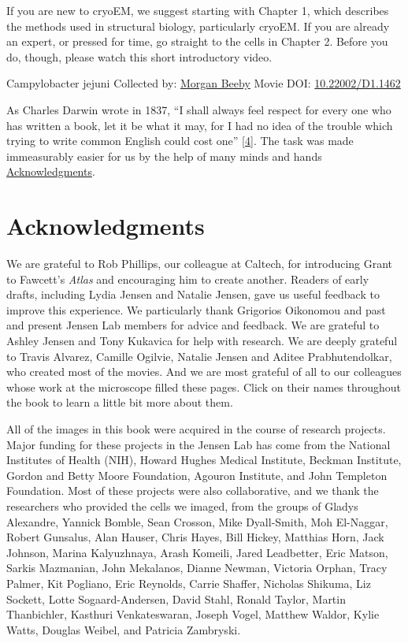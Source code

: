 \documentclass[]{tufte-book}
\begin{document}
If you are new to cryoEM, we suggest starting with Chapter 1, which describes the methods used in structural biology, particularly cryoEM. If you are already an expert, or pressed for time, go straight to the cells in Chapter 2. Before you do, though, please watch this short introductory video.



\hypertarget{htmlwidget-7f3e44a4f1878ac69c61}{}

\label{fig:0-1}Campylobacter jejuni Collected by: \protect\hyperlink{morgan_beeby}{Morgan Beeby} Movie DOI: \href{https://doi.org/10.22002/D1.1462}{10.22002/D1.1462}

As Charles Darwin wrote in 1837, ``I shall always feel respect for every one who has written a book, let it be what it may, for I had no idea of the trouble which trying to write common English could cost one'' {[}\protect\hyperlink{ref-darwin1888}{4}{]}. The task was made immeasurably easier for us by the help of many minds and hands \protect\hyperlink{acknowledgments}{Acknowledgments}.

\hypertarget{acknowledgments}{%
\section*{Acknowledgments}\label{acknowledgments}}

We are grateful to Rob Phillips, our colleague at Caltech, for introducing Grant to Fawcett's \emph{Atlas} and encouraging him to create another. Readers of early drafts, including Lydia Jensen and Natalie Jensen, gave us useful feedback to improve this experience. We particularly thank Grigorios Oikonomou and past and present Jensen Lab members for advice and feedback. We are grateful to Ashley Jensen and Tony Kukavica for help with research. We are deeply grateful to Travis Alvarez, Camille Ogilvie, Natalie Jensen and Aditee Prabhutendolkar, who created most of the movies. And we are most grateful of all to our colleagues whose work at the microscope filled these pages. Click on their names throughout the book to learn a little bit more about them.

All of the images in this book were acquired in the course of research projects. Major funding for these projects in the Jensen Lab has come from the National Institutes of Health (NIH), Howard Hughes Medical Institute, Beckman Institute, Gordon and Betty Moore Foundation, Agouron Institute, and John Templeton Foundation. Most of these projects were also collaborative, and we thank the researchers who provided the cells we imaged, from the groups of Gladys Alexandre, Yannick Bomble, Sean Crosson, Mike Dyall-Smith, Moh El-Naggar, Robert Gunsalus, Alan Hauser, Chris Hayes, Bill Hickey, Matthias Horn, Jack Johnson, Marina Kalyuzhnaya, Arash Komeili, Jared Leadbetter, Eric Matson, Sarkis Mazmanian, John Mekalanos, Dianne Newman, Victoria Orphan, Tracy Palmer, Kit Pogliano, Eric Reynolds, Carrie Shaffer, Nicholas Shikuma, Liz Sockett, Lotte Sogaard-Andersen, David Stahl, Ronald Taylor, Martin Thanbichler, Kasthuri Venkateswaran, Joseph Vogel, Matthew Waldor, Kylie Watts, Douglas Weibel, and Patricia Zambryski.
\end{document}
